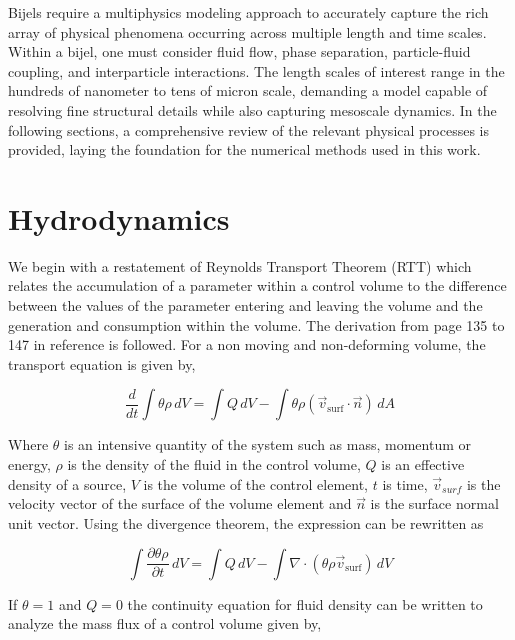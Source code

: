 Bijels require a multiphysics modeling approach to accurately capture the rich array of physical phenomena 
occurring across multiple length and time scales. Within a bijel, one must consider fluid flow, phase separation, particle-fluid coupling, and interparticle 
interactions. The length scales of interest range in the hundreds of nanometer to  tens of micron scale, demanding a model capable of resolving fine structural details while also 
capturing mesoscale dynamics. In the following sections, a comprehensive review of the relevant physical processes is provided, laying the foundation for the 
numerical methods used in this work.

\section{Hydrodynamics}

We begin with a restatement of Reynolds Transport Theorem (RTT) which relates the accumulation of a parameter within a control volume to the difference between the values
of the parameter entering and leaving the volume and the generation and consumption within the volume. The derivation from page 135 to 147 in reference \cite{batchelor_introduction_2000}
is followed. For a non moving and non-deforming volume, the transport equation is given by,

\begin{equation}
    \frac{d}{dt} \int \theta \rho \, dV = \int Q \, dV - \int \theta \rho (\vec{v}_{\text{surf}} \cdot \vec{n}) \, dA
\end{equation}

Where $\theta$ is an intensive quantity of the system such as mass, momentum or energy, $\rho$ is the density of the fluid in the control volume, $Q$ is an effective density
of a source, $V$ is the volume of the control element, $t$ is time, $\vec{v}_{surf}$ is the velocity vector 
of the surface of the volume element and $\vec{n}$ is the surface normal unit vector. \cite{batchelor_introduction_2000} Using the divergence theorem, the expression can be rewritten as

\begin{equation}
    \int \frac{\partial \theta \rho}{\partial t} \, dV = \int Q \, dV - \int \nabla \cdot (\theta \rho \vec{v}_{\text{surf}}) \, dV
\end{equation}

If $\theta = 1$ and $Q = 0$ the continuity equation for fluid density can be written to analyze the mass flux of a control volume given by,

